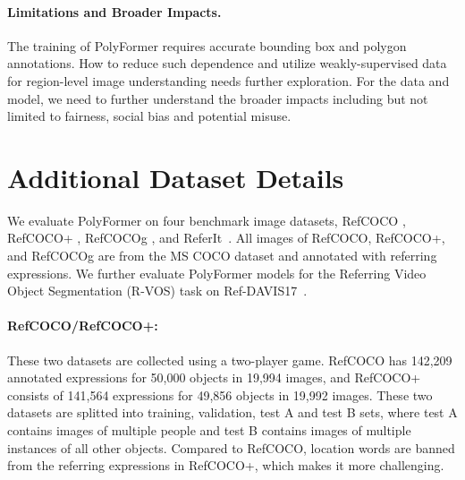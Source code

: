 



















\paragraph{Limitations and Broader Impacts.}
The training of PolyFormer requires accurate bounding box and polygon annotations. How to reduce such dependence and utilize weakly-supervised data for region-level image understanding needs further exploration. For the data and model, we need to further understand the broader impacts including but not limited to fairness, social bias and potential misuse.

























\section{Additional Dataset Details}
We evaluate PolyFormer on four benchmark image datasets, RefCOCO \cite{yu2016modeling}, RefCOCO+ \cite{yu2016modeling}, RefCOCOg \cite{mao2016generation, nagaraja2016modeling}, and ReferIt~\cite{referit}. All images of RefCOCO, RefCOCO+, and RefCOCOg are from the MS COCO dataset \cite{mscoco} and annotated with referring expressions. We further evaluate PolyFormer models for the Referring Video Object Segmentation (R-VOS) task on Ref-DAVIS17~\cite{khoreva2018video}.


\paragraph{\textbf{RefCOCO/RefCOCO+}:} These two datasets are collected using a two-player game\cite{yu2016modeling}. RefCOCO has 142,209 annotated expressions for 50,000 objects in 19,994 images, and RefCOCO+ consists of 141,564 expressions for 49,856 objects in 19,992 images. These two datasets are splitted into training, validation, test A and test B sets, where test A contains images of multiple people and test B contains images of multiple instances of all other objects. Compared to RefCOCO, location words are banned from the referring expressions in RefCOCO+, which makes it more challenging. 

